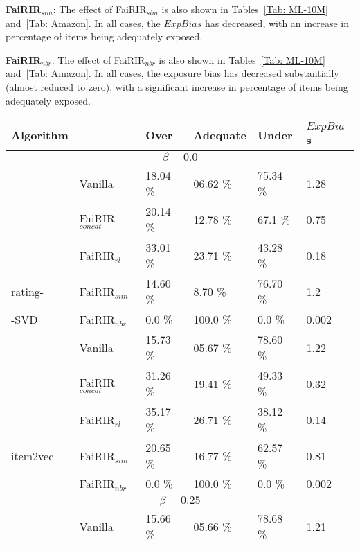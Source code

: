 \noindent
\textbf{FaiRIR$_{sim}$}: The effect of FaiRIR$_{sim}$ is also shown in Tables~\ref{Tab: ML-10M} and~\ref{Tab: Amazon}. %
In all cases, the $ExpBias$ has decreased, with an increase in percentage of items being adequately exposed.  


\noindent
\textbf{FaiRIR$_{nbr}$}: The effect of FaiRIR$_{nbr}$ is also shown in Tables~\ref{Tab: ML-10M} and~\ref{Tab: Amazon}. %
In all cases, the exposure bias has decreased substantially (almost reduced to zero), with a significant increase in percentage of items being adequately exposed. 






\begin{table}[tb]
	\noindent
	\scriptsize
	\centering
	\begin{tabular}{|p{1cm}|p{1.2cm}||p{1.0cm}|p{1.0 cm}|p{1.0cm}||p{1.0 cm}| }
		\hline
		Algorithm &  & Over & Adequate & Under & $ExpBia$s \\
		\hline
		\multicolumn{6}{|c|}{\bf $\beta = 0.0$}\\
		\hline \hline
		& Vanilla 		& 18.04 \% & 06.62 \% & 75.34 \% & 1.28\\ \cline{2-6}
		& FaiRIR$_{concat}$	& 20.14 \% & 12.78 \% & 67.1 \% & 0.75\\ \cline{2-6}
		& FaiRIR$_{rl}$ 	& 33.01 \% & 23.71 \% & 43.28 \% & 0.18\\ \cline{2-6}
		rating-& FaiRIR$_{sim}$	& 14.60 \% & 8.70 \% & 76.70 \% & 1.2\\ \cline{2-6}
		-SVD& FaiRIR$_{nbr}$	& 0.0 \% & 100.0 \% & 0.0 \% & 0.002\\ \cline{2-6}
		\hline \hline
		& Vanilla 		& 15.73 \%& 05.67 \% & 78.60 \% & 1.22  \\ \cline{2-6}
		& FaiRIR$_{concat}$	& 31.26 \%& 19.41 \% & 49.33 \% & 0.32  \\ \cline{2-6}
		& FaiRIR$_{rl}$ 	& 35.17 \%& 26.71 \% & 38.12 \% & 0.14  \\ \cline{2-6}
		item2vec & FaiRIR$_{sim}$	& 20.65 \%& 16.77 \% & 62.57 \% & 0.81  \\ \cline{2-6}
		& FaiRIR$_{nbr}$	& 0.0 \% & 100.0 \% & 0.0 \% & 0.002  \\ 
		\hline \hline
		\multicolumn{6}{|c|}{\bf $\beta = 0.25$}\\
		\hline 
		& Vanilla 		& 15.66 \%& 05.66 \% & 78.68 \% & 1.21  \\ \cline{2-6}

\end{tabular}
\end{table}
